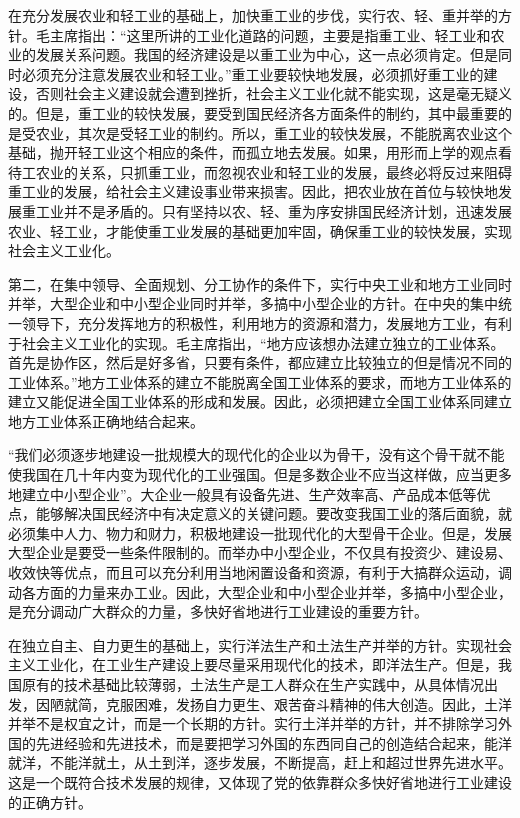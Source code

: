 \documentclass{book}
\begin{document}
在充分发展农业和轻工业的基础上，加快重工业的步伐，实行农、轻、重并举的方针。毛主席指出：“这里所讲的工业化道路的问题，主要是指重工业、轻工业和农业的发展关系问题。我国的经济建设是以重工业为中心，这一点必须肯定。但是同时必须充分注意发展农业和轻工业。”重工业要较快地发展，必须抓好重工业的建设，否则社会主义建设就会遭到挫折，社会主义工业化就不能实现，这是毫无疑义的。但是，重工业的较快发展，要受到国民经济各方面条件的制约，其中最重要的是受农业，其次是受轻工业的制约。所以，重工业的较快发展，不能脱离农业这个基础，抛开轻工业这个相应的条件，而孤立地去发展。如果，用形而上学的观点看待工农业的关系，只抓重工业，而忽视农业和轻工业的发展，最终必将反过来阻碍重工业的发展，给社会主义建设事业带来损害。因此，把农业放在首位与较快地发展重工业并不是矛盾的。只有坚持以农、轻、重为序安排国民经济计划，迅速发展农业、轻工业，才能使重工业发展的基础更加牢固，确保重工业的较快发展，实现社会主义工业化。

第二，在集中领导、全面规划、分工协作的条件下，实行中央工业和地方工业同时并举，大型企业和中小型企业同时并举，多搞中小型企业的方针。在中央的集中统一领导下，充分发挥地方的积极性，利用地方的资源和潜力，发展地方工业，有利于社会主义工业化的实现。毛主席指出，“地方应该想办法建立独立的工业体系。首先是协作区，然后是好多省，只要有条件，都应建立比较独立的但是情况不同的工业体系。”地方工业体系的建立不能脱离全国工业体系的要求，而地方工业体系的建立又能促进全国工业体系的形成和发展。因此，必须把建立全国工业体系同建立地方工业体系正确地结合起来。

“我们必须逐步地建设一批规模大的现代化的企业以为骨干，没有这个骨干就不能使我国在几十年内变为现代化的工业强国。但是多数企业不应当这样做，应当更多地建立中小型企业”。大企业一般具有设备先进、生产效率高、产品成本低等优点，能够解决国民经济中有决定意义的关键问题。要改变我国工业的落后面貌，就必须集中人力、物力和财力，积极地建设一批现代化的大型骨干企业。但是，发展大型企业是要受一些条件限制的。而举办中小型企业，不仅具有投资少、建设易、收效快等优点，而且可以充分利用当地闲置设备和资源，有利于大搞群众运动，调动各方面的力量来办工业。因此，大型企业和中小型企业并举，多搞中小型企业，是充分调动广大群众的力量，多快好省地进行工业建设的重要方针。

在独立自主、自力更生的基础上，实行洋法生产和土法生产并举的方针。实现社会主义工业化，在工业生产建设上要尽量采用现代化的技术，即洋法生产。但是，我国原有的技术基础比较薄弱，土法生产是工人群众在生产实践中，从具体情况出发，因陋就简，克服困难，发扬自力更生、艰苦奋斗精神的伟大创造。因此，土洋并举不是权宜之计，而是一个长期的方针。实行土洋并举的方针，并不排除学习外国的先进经验和先进技术，而是要把学习外国的东西同自己的创造结合起来，能洋就洋，不能洋就土，从土到洋，逐步发展，不断提高，赶上和超过世界先进水平。这是一个既符合技术发展的规律，又体现了党的依靠群众多快好省地进行工业建设的正确方针。
\end{document}
